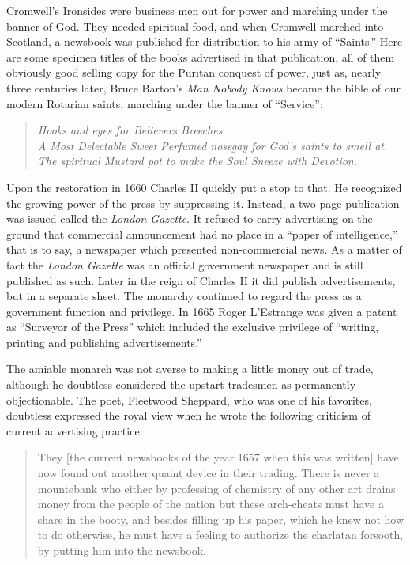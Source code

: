 \documentclass[twoside,nohyper,openany,nobib]{tufte-book}
\begin{document}
Cromwell's Ironsides were business men out for power and marching under
the banner of God. They needed spiritual food, and when Cromwell marched
into Scotland, a newsbook was published for distribution to his army of
``Saints.'' Here are some specimen titles of the books advertised in
that publication, all of them obviously good selling copy for the
Puritan conquest of power, just as, nearly three centuries later, Bruce
Barton's \emph{Man Nobody Knows} became the bible of our modern Rotarian
saints, marching under the banner of ``Service'':

\begin{quote}
\emph{Hooks and eyes for Believers Breeches}\\
\emph{A Most Delectable Sweet Perfumed nosegay for God's saints to smell
at.}\\
\emph{The spiritual Mustard pot to make the Soul Sneeze with Devotion.}
\end{quote}

Upon the restoration in 1660 Charles II quickly put a stop to that. He
recognized the growing power of the press by suppressing it. Instead, a
two-page publication was issued called the \emph{London Gazette}. It
refused to carry advertising on the ground that commercial announcement
had no place in a ``paper of intelligence,'' that is to say, a newspaper
which presented non-commercial news. As a matter of fact the
\emph{London Gazette} was an official government newspaper and is still
published as such. Later in the reign of Charles II it did publish
advertisements, but in a separate sheet. The monarchy continued to
regard the press as a government function and privilege. In 1665 Roger
L'Estrange was given a patent as ``Surveyor of the Press'' which
included the exclusive privilege of ``writing, printing and publishing
advertisements.''

The amiable monarch was not averse to making a little money out of
trade, although he doubtless considered the upstart tradesmen as
permanently objectionable. The poet, Fleetwood Sheppard, who was one of
his favorites, doubtless expressed the royal view when he wrote the
following criticism of current advertising practice:

\begin{quote}
They {[}the current newsbooks of the year 1657 when this was written{]}
have now found out another quaint device in their trading. There is
never a mountebank who either by professing of chemistry of any other
art drains money from the people of the nation but these arch-cheats
must have a share in the booty, and besides filling up his paper, which
he knew not how to do otherwise, he must have a feeling to authorize the
charlatan forsooth, by putting him into the newsbook.
\end{quote}
\end{document}
